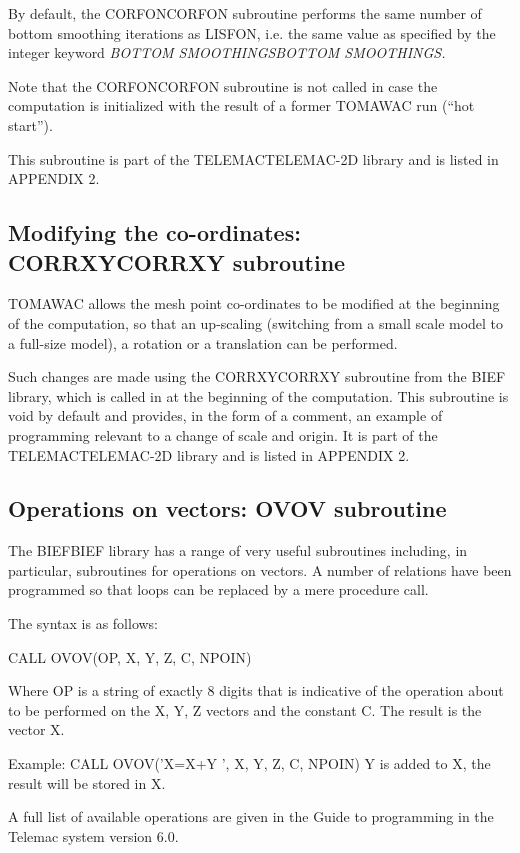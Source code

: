  By default, the CORFONCORFON subroutine performs the same number of bottom smoothing iterations as LISFON, i.e. the same value as specified by the integer keyword \textit{BOTTOM SMOOTHINGSBOTTOM SMOOTHINGS.}

 Note that the CORFONCORFON subroutine is not called in case the computation is initialized with the result of a former TOMAWAC run (``hot start'').

 This subroutine is part of the TELEMACTELEMAC-2D library and is listed in APPENDIX 2.


\subsection{ Modifying the co-ordinates: CORRXYCORRXY subroutine }

 TOMAWAC allows the mesh point co-ordinates to be modified at the beginning of the computation, so that an up-scaling (switching from a small scale model to a full-size model), a rotation or a translation can be performed.

 Such changes are made using the CORRXYCORRXY subroutine from the BIEF library, which is called in at the beginning of the computation. This subroutine is void by default and provides, in the form of a comment, an example of programming relevant to a change of scale and origin. It is part of the TELEMACTELEMAC-2D library and is listed in APPENDIX 2.


\subsection{ Operations on vectors: OVOV subroutine }

 The BIEFBIEF library has a range of very useful subroutines including, in particular, subroutines for operations on vectors. A number of relations have been programmed so that loops can be replaced by a mere procedure call.

 The syntax is as follows:

 CALL OVOV(OP, X, Y, Z, C, NPOIN)

 Where OP is a string of exactly 8 digits that is indicative of the operation about to be performed on the X, Y, Z vectors and the constant C. The result is the vector X.

 Example:  CALL OVOV('X=X+Y ', X, Y, Z, C, NPOIN)  Y is added to X, the result will be stored in X.



 A full list of available operations are given in the Guide to programming in the Telemac system version 6.0.

